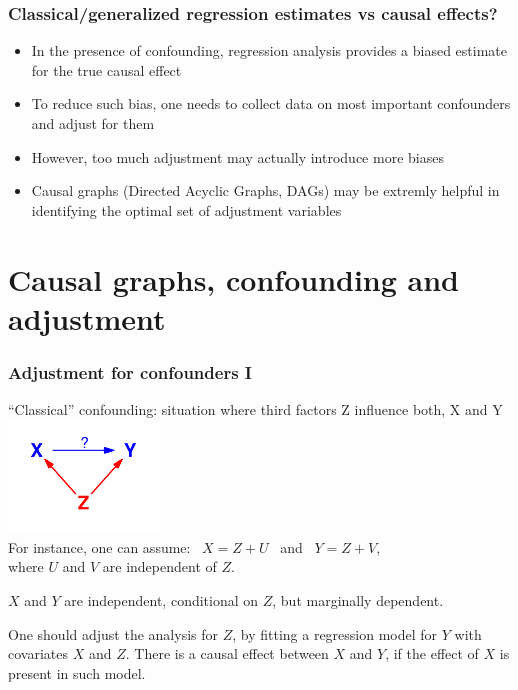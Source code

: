\documentclass[xcolor=svgnames,handout]{beamer}
\begin{document}
\begin{frame}
 \frametitle{Classical/generalized regression estimates vs  causal effects?}
 \begin{itemize}
 \item In the presence of confounding, regression analysis provides a biased estimate for the true causal effect
\item To reduce such bias, one needs to collect data on most important confounders and adjust for them
\item However, too much adjustment may actually introduce more biases   
\item Causal graphs (Directed Acyclic Graphs, DAGs) may be extremly helpful in identifying the optimal set of adjustment variables
\end{itemize}
 \end{frame}


\section{Causal graphs, confounding and adjustment}

\begin{frame}
  \frametitle{Adjustment for confounders I}
 ``Classical'' confounding: situation where third factors  Z influence both, X and Y \\[-0.2cm]
\includegraphics[width=4cm]{confound}\\[-0.3cm]
For instance, one can assume: \ $X = Z + U$ \ and \ $Y = Z + V$, \\
where $U$ and $V$ are independent of  $Z$. \pause

$X$ and $Y$ are independent, conditional on $Z$, but marginally dependent.

\alert{One should adjust the analysis for $Z$, by fitting a regression model for $Y$ with covariates
 $X$  and $Z$.} There is a causal effect between $X$ and $Y$, if the effect of $X$ is present in such model.
\end{frame}
\end{document}
